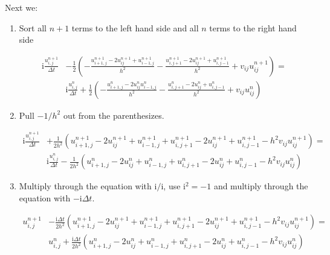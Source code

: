 \documentclass[../main_proj5.tex]{subfiles}
\begin{document}
\noindent Next we: 
\begin{enumerate}
    \item Sort all $n+1$ terms to the left hand side and all $n$ terms to the right hand side
    
\begin{equation*} 
\begin{split} 
\text{i} \frac{u_{i,j}^{n+1}}{\Delta t} &- \frac{1}{2}\left( -\frac{u_{i+1, j}^{n+1} -2u_{ij}^{n+1} + u_{i-1, j}^{n+1}}{h^{2}} - \frac{u_{i, j+1}^{n+1} -2u_{ij}^{n+1} + u_{i, j-1}^{n+1}}{h^{2}} + v_{ij} u_{ij}^{n+1} \right) = \\& 
\text{i} \frac{u_{i,j}^{n}}{\Delta t} + \frac{1}{2}\left(-\frac{u_{i+1, j}^{n} -2u_{ij}^{n}  u_{i-1, j}^{n}}{h^{2}} - \frac{u_{i, j+1}^{n} -2u_{ij}^{n} + u_{i, j-1}^{n}}{h^{2}} + v_{ij} u_{ij}^{n} \right) 
\end{split}
\end{equation*}

    \item Pull $-1/h^{2}$ out from the parenthesizes.

\begin{equation*} 
\begin{split} 
\text{i} \frac{u_{i,j}^{n+1}}{\Delta t} &+ \frac{1}{2h^{2}}\left( u_{i+1, j}^{n+1} -2u_{ij}^{n+1} + u_{i-1, j}^{n+1} + u_{i, j+1}^{n+1} -2u_{ij}^{n+1} + u_{i, j-1}^{n+1} - h^{2} v_{ij} u_{ij}^{n+1} \right) = \\& 
\text{i} \frac{u_{i,j}^{n}}{\Delta t} - \frac{1}{2h^{2}}\left(u_{i+1, j}^{n} -2u_{ij}^{n} + u_{i-1, j}^{n} + u_{i, j+1}^{n} -2u_{ij}^{n} + u_{i, j-1}^{n} - h^{2} v_{ij} u_{ij}^{n} \right) 
\end{split}
\end{equation*}

    \item Multiply through the equation with $\text{i}/\text{i}$, use $\text{i}^{2}=-1$ and multiply through the equation with $-\text{i}\Delta t$.
    
\begin{equation*} 
\begin{split} 
u_{i,j}^{n+1} &- \frac{\text{i}\Delta t}{2h^{2}}\left( u_{i+1, j}^{n+1} -2u_{ij}^{n+1} + u_{i-1, j}^{n+1} + u_{i, j+1}^{n+1} -2u_{ij}^{n+1} + u_{i, j-1}^{n+1} - h^{2} v_{ij} u_{ij}^{n+1} \right) = \\& 
 u_{i,j}^{n} + \frac{\text{i}\Delta t}{2h^{2}}\left(u_{i+1, j}^{n} -2u_{ij}^{n} + u_{i-1, j}^{n} + u_{i, j+1}^{n} -2u_{ij}^{n} + u_{i, j-1}^{n} - h^{2} v_{ij} u_{ij}^{n} \right) 
\end{split}
\end{equation*}


\end{enumerate}
\end{document}
